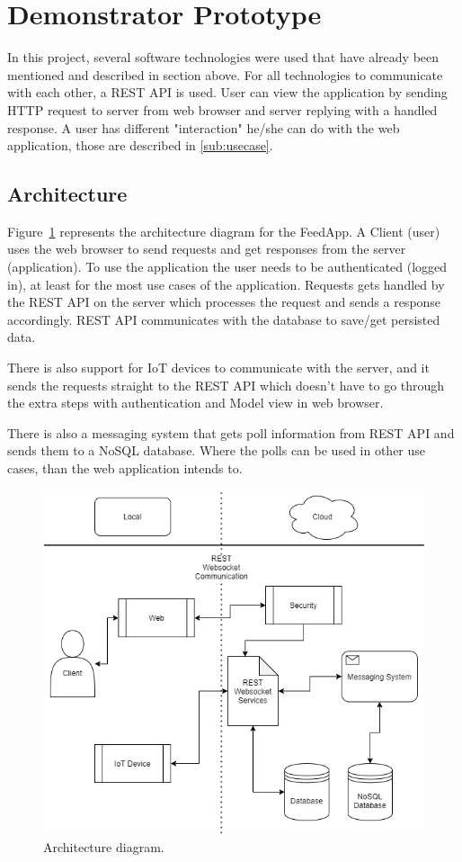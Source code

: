 \section{Demonstrator Prototype}
\label{sec:design}

In this project, several software technologies were used that have already been mentioned and described in section above. For all technologies to communicate with each other, a REST API is used. User can view the application by sending HTTP request to server from web browser and server replying with a handled response. A user has different "interaction" he/she can do with the web application, those are described in \ref{sub:usecase}.

\subsection{Architecture}
\label{sub:architeure}
Figure~\ref{fig:archdiagram} represents the architecture diagram for the FeedApp.
A Client (user) uses the web browser to send requests and get responses from the server (application). To use the application the user needs to be authenticated (logged in), at least for the most use cases of the application. Requests gets handled by the REST API on the server which processes the request and sends a response accordingly. REST API communicates with the database to save/get persisted data.

There is also support for IoT devices to communicate with the server, and it sends the requests straight to the REST API which doesn't have to go through the extra steps with authentication and Model view in web browser.

There is also a messaging system that gets poll information from REST API and sends them to a NoSQL database. Where the polls can be used in other use cases, than the web application intends to.
\begin{figure}[H]
  \centering
  \includegraphics[scale=0.5]{figs/archdiagram.png}
  \caption[scale=0.5]{Architecture diagram.}
  \label{fig:archdiagram}
\end{figure}

